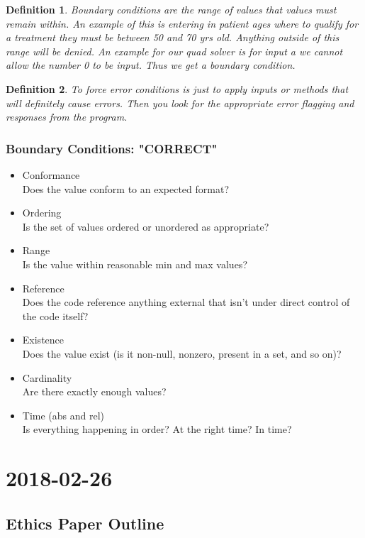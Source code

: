 \documentclass{report}
\newtheorem*{defn}{Definition}
\newcommand{\mychapter}[2]{
	\setcounter{chapter}{#1}
	\setcounter{section}{0}
	\chapter*{#2}
	\addcontentsline{toc}{chapter}{#2}
}
\begin{document}
\begin{defn}
Boundary conditions are the range of values that values must remain within. An example of this is entering in patient ages where to qualify for a treatment they must be between 50 and 70 yrs old. Anything outside of this range will be denied. An example for our quad solver is for input a we cannot allow the number 0 to be input. Thus we get a boundary condition.
\end{defn}

\begin{defn}
To force error conditions is just to apply inputs or methods that will definitely cause errors. Then you look for the appropriate error flagging and responses from the program.
\end{defn}

\subsection{Boundary Conditions: "CORRECT"}
\begin{itemize}
\item Conformance\\  Does the value conform to an expected format?
\item Ordering\\  Is the set of values ordered or unordered as appropriate?
\item Range\\  Is the value within reasonable min and max values?
\item Reference\\  Does the code reference anything external that isn't under direct control of the code itself?
\item Existence\\  Does the value exist (is it non-null, nonzero, present in a set, and so on)?
\item Cardinality\\  Are there exactly enough values?
\item Time (abs and rel)\\  Is everything happening in order? At the right time? In time?
\end{itemize}

\mychapter{2}{2018-02-26}
\section{Ethics Paper Outline}
\end{document}

